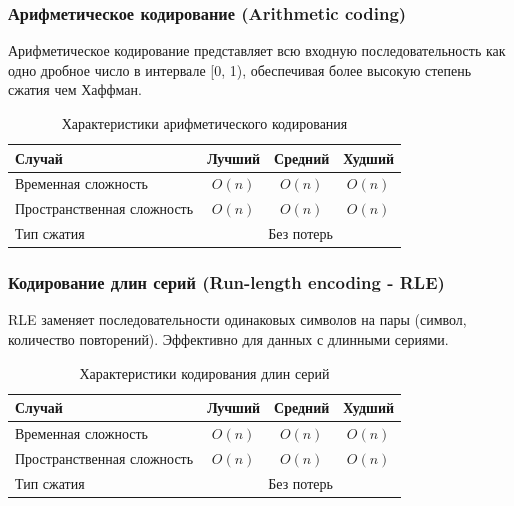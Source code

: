 \documentclass[a4paper,12pt]{article}
\begin{document}
\subsubsection{Арифметическое кодирование (Arithmetic coding)}
\label{subsubsec:арифметическое-кодирование-arithmetic-coding}

Арифметическое кодирование представляет всю входную последовательность как одно дробное число в интервале [0, 1), обеспечивая более высокую степень сжатия чем Хаффман.

\begin{table}[H]
    \centering
    \begin{tabular}{|l|c|c|c|}
        \hline
        Случай & Лучший & Средний & Худший \\
        \hline
        Временная сложность & $O(n)$ & $O(n)$ & $O(n)$ \\
        \hline
        Пространственная сложность & $O(n)$ & $O(n)$ & $O(n)$ \\
        \hline
        Тип сжатия & \multicolumn{3}{c|}{Без потерь} \\
        \hline
    \end{tabular}
    \caption{Характеристики арифметического кодирования}
\end{table}

\subsubsection{Кодирование длин серий (Run-length encoding - RLE)}
\label{subsubsec:кодирование-длин-серий-run-length-encoding-rle}

RLE заменяет последовательности одинаковых символов на пары (символ, количество повторений). Эффективно для данных с длинными сериями.

\begin{table}[H]
    \centering
    \begin{tabular}{|l|c|c|c|}
        \hline
        Случай & Лучший & Средний & Худший \\
        \hline
        Временная сложность & $O(n)$ & $O(n)$ & $O(n)$ \\
        \hline
        Пространственная сложность & $O(n)$ & $O(n)$ & $O(n)$ \\
        \hline
        Тип сжатия & \multicolumn{3}{c|}{Без потерь} \\
        \hline
    \end{tabular}
    \caption{Характеристики кодирования длин серий}
\end{table}
\end{document}
